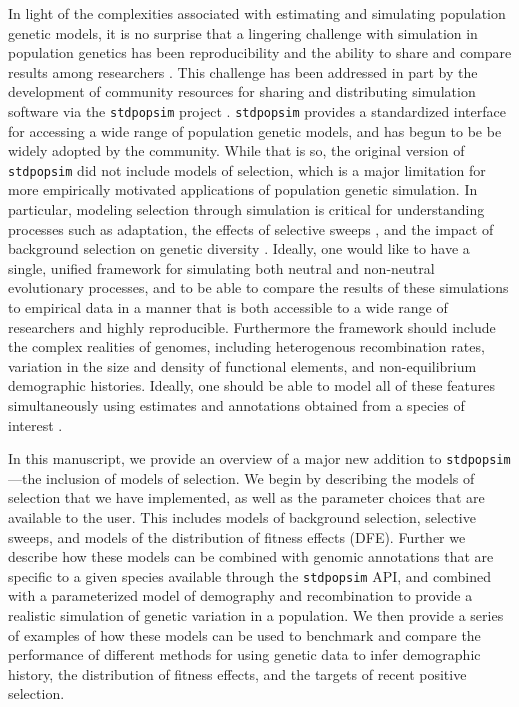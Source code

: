 \documentclass[hidelinks]{article}
\newcommand{\stdpopsim}{\texttt{stdpopsim}\xspace}
\begin{document}
    In light of the complexities associated with estimating and simulating
    population genetic models, it is no surprise that
    a lingering challenge with simulation in population genetics has been
    reproducibility and the ability to share and compare results among 
    researchers \citep[e.g.,][]{ragsdale2020lessons}.
    This challenge has been addressed in part by the development
    of community resources for sharing and distributing simulation software
    via the \stdpopsim project \citep{adrion2020community}. \stdpopsim
    provides a standardized interface for accessing a wide range of
    population genetic models, and has begun to be be widely adopted by the community. %
    While that is so, the original version of \stdpopsim did not include
    models of selection, which is a major limitation for more empirically motivated
    applications of population genetic simulation. In particular, modeling selection
    through simulation is critical for understanding processes such
    as adaptation\citep[e.g.][]{thornton2019polygenic,hartfield2024polygenic}, the effects of selective sweeps \citep[e.g.][]{braverman1995hitchhiking,fay2000hitchhiking,przeworski2002signature,przeworski2005signature,schrider2015soft}, and the impact of
    background selection on genetic diversity
    \citep[e.g.][]{charlesworth1993effect,charlesworth1995pattern,williamson2002genealogy,ewing2016consequences,torres2020temporal}.
    Ideally, one would like
    to have a single, unified framework for simulating both neutral and
    non-neutral evolutionary processes, and to be able to compare the
    results of these simulations to empirical data in a manner that is
    both accessible to a wide range of researchers and highly reproducible. 
    Furthermore the framework should include the complex realities of 
    genomes, including heterogenous recombination rates, 
    variation in the size and density of functional elements, and
    non-equilibrium demographic histories. Ideally, one should be able
    to model all of these features simultaneously using estimates and annotations obtained
    from a species of interest \citep[e.g.][]{schrider2020background,rodrigues2024shared}.

    In this manuscript, we provide an overview of a major new addition
    to \stdpopsim---the inclusion of models of selection.
    We begin by describing the models of selection that we have implemented,
    as well as the parameter choices that are available to the user.
    This includes models of background selection, selective sweeps, and
    models of the distribution of fitness effects (DFE).
    Further we describe how these models can be combined with genomic
    annotations that are specific to a given species available
    through the \stdpopsim API, and combined with a parameterized model of
    demography and recombination to provide a realistic simulation of
    genetic variation in a population.
    We then provide a series of examples of how these models can be used
    to benchmark and compare the performance of different methods for
    using genetic data to infer demographic history, the distribution of fitness effects,
    and the targets of recent positive selection. 
\end{document}
